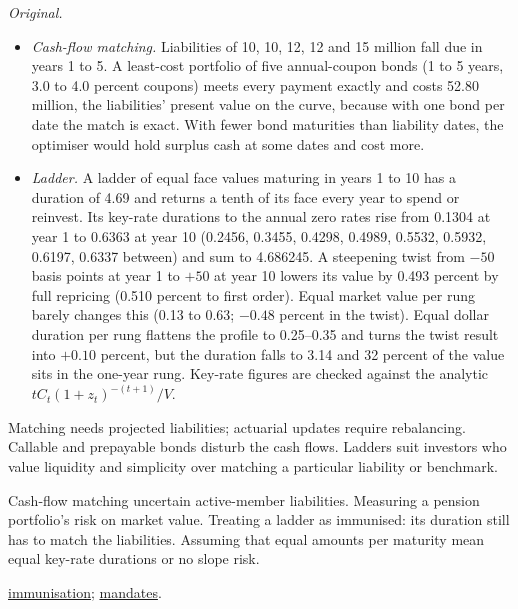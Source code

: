 \begin{qfmethod}
 \emph{Original.}
\begin{itemize}
\item \emph{Cash-flow matching.} Liabilities of 10, 10, 12, 12 and 15 million fall due in years 1 to 5. A least-cost portfolio of five annual-coupon bonds (1 to 5 years, 3.0 to 4.0 percent coupons) meets every payment exactly and costs 52.80 million, the liabilities' present value on the curve, because with one bond per date the match is exact. With fewer bond maturities than liability dates, the optimiser would hold surplus cash at some dates and cost more.
\item \emph{Ladder.} A ladder of equal face values maturing in years 1 to 10 has a duration of 4.69 and returns a tenth of its face every year to spend or reinvest. Its key-rate durations to the annual zero rates rise from 0.1304 at year 1 to 0.6363 at year 10 (0.2456, 0.3455, 0.4298, 0.4989, 0.5532, 0.5932, 0.6197, 0.6337 between) and sum to 4.686245. A steepening twist from $-50$ basis points at year 1 to $+50$ at year 10 lowers its value by 0.493 percent by full repricing (0.510 percent to first order). Equal market value per rung barely changes this (0.13 to 0.63; $-0.48$ percent in the twist). Equal dollar duration per rung flattens the profile to 0.25--0.35 and turns the twist result into $+0.10$ percent, but the duration falls to 3.14 and 32 percent of the value sits in the one-year rung. Key-rate figures are checked against the analytic $tC_t(1+z_t)^{-(t+1)}/V$.
\end{itemize}

 Matching needs projected liabilities; actuarial updates require rebalancing. Callable and prepayable bonds disturb the cash flows. Ladders suit investors who value liquidity and simplicity over matching a particular liability or benchmark.

 Cash-flow matching uncertain active-member liabilities. Measuring a pension portfolio's risk on market value. Treating a ladder as immunised: its duration still has to match the liabilities. Assuming that equal amounts per maturity mean equal key-rate durations or no slope risk.

 \hyperref[meth:immunisation-liabilities]{immunisation}; \hyperref[def:fixed-income-mandates-return-model]{mandates}.

\end{qfmethod}

